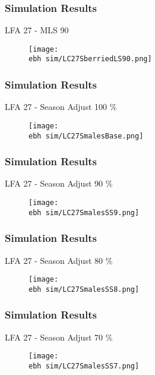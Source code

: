 \documentclass{beamer}
\newcommand{\ebh}{\string~/bio.data/bio.lobster/figures/LFA2733Framework2018/} %
\begin{document}
\begin{frame}
\frametitle{Simulation Results}
LFA 27 - MLS 90
\begin{figure}
        \begin{center}
            \texttt{[image: \\ebh sim/LC27SberriedLS90.png]}
        \end{center}
    \end{figure}
\end{frame}




\begin{frame}
\frametitle{Simulation Results}
LFA 27 - Season Adjust 100 \%
\begin{figure}
        \begin{center}
            \texttt{[image: \\ebh sim/LC27SmalesBase.png]}
        \end{center}
    \end{figure}
\end{frame}


\begin{frame}
\frametitle{Simulation Results}
LFA 27 - Season Adjust 90 \%
\begin{figure}
        \begin{center}
            \texttt{[image: \\ebh sim/LC27SmalesSS9.png]}
        \end{center}
    \end{figure}
\end{frame}


\begin{frame}
\frametitle{Simulation Results}
LFA 27 - Season Adjust 80 \%
\begin{figure}
        \begin{center}
            \texttt{[image: \\ebh sim/LC27SmalesSS8.png]}
        \end{center}
    \end{figure}
\end{frame}


\begin{frame}
\frametitle{Simulation Results}
LFA 27 - Season Adjust 70 \%
\begin{figure}
        \begin{center}
            \texttt{[image: \\ebh sim/LC27SmalesSS7.png]}
        \end{center}
    \end{figure}
\end{frame}
\end{document}
